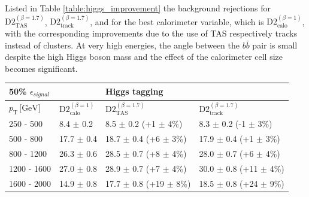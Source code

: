 Listed in Table \ref{table:higgs_improvement} the background rejections for $\text{D2}_{\text{TAS}}^{(\beta=1.7)}$, $\text{D2}_{\text{track}}^{(\beta=1.7)}$, and for the best calorimeter variable, which is $\text{D2}_{\text{calo}}^{(\beta=1)}$, with the corresponding improvements due to the use of TAS respectively tracks instead of clusters. At very high energies, the angle between the $b\bar{b}$ pair is small despite the high Higgs boson mass and the effect of the calorimeter cell size becomes significant. 
\begin{table}[]
\centering
\begin{tabular}{llll}
 \multicolumn{1}{l||}{\textbf{50\% $\epsilon_{signal}$}} &                                                &  \textbf{Higgs tagging}                                        &                                          \\ \hline
\multicolumn{1}{l||}{$p_{\mathrm{T}} \, \text{[GeV]}$}           & \multicolumn{1}{l|}{$\text{D2}_{\text{calo}}^{(\beta=1)}$} & \multicolumn{1}{l|}{$\text{D2}_{\text{TAS}}^{(\beta=1.7)}$} & \multicolumn{1}{l|}{$\text{D2}_{\text{track}}^{(\beta=1.7)}$} \\ \hline \hline
\multicolumn{1}{l||}{250 - 500}                       & \multicolumn{1}{l|}{8.4 $\pm$ 0.2}                      & \multicolumn{1}{l|}{\cellcolor{Red!50}8.5 $\pm$ 0.2 (+1 $\pm$ 4\%)}          & \multicolumn{1}{l|}{8.3 $\pm$ 0.2 (-1 $\pm$ 3\%)}        \\
\multicolumn{1}{l||}{500 - 800}                       & \multicolumn{1}{l|}{17.7 $\pm$ 0.4}                      & \multicolumn{1}{l|}{\cellcolor{Red!50}18.7 $\pm$ 0.4 (+6 $\pm$ 3\%)}        & \multicolumn{1}{l|}{17.9 $\pm$ 0.4 (+1 $\pm$ 3\%)}         \\
\multicolumn{1}{l||}{800 - 1200}                      & \multicolumn{1}{l|}{26.3 $\pm$ 0.6}                      & \multicolumn{1}{l|}{\cellcolor{Red!50}28.5 $\pm$ 0.7 (+8 $\pm$ 4\%)}        & \multicolumn{1}{l|}{28.0 $\pm$ 0.7 (+6 $\pm$ 4\%)}        \\
\multicolumn{1}{l||}{1200 - 1600}                     & \multicolumn{1}{l|}{27.0 $\pm$ 0.8}                      & \multicolumn{1}{l|}{28.9 $\pm$ 0.7 (+7 $\pm$ 4\%)}        & \multicolumn{1}{l|}{\cellcolor{Red!50}30.0 $\pm$ 0.8 (+11 $\pm$ 4\%)}        \\
\multicolumn{1}{l||}{1600 - 2000}                     & \multicolumn{1}{l|}{14.9 $\pm$ 0.8}                      & \multicolumn{1}{l|}{17.7 $\pm$ 0.8 (+19 $\pm$ 8\%)}       & \multicolumn{1}{l|}{\cellcolor{Red!50}18.5 $\pm$ 0.8 (+24 $\pm$ 9\%)}       \\ \hline

\end{tabular}
\end{table}
